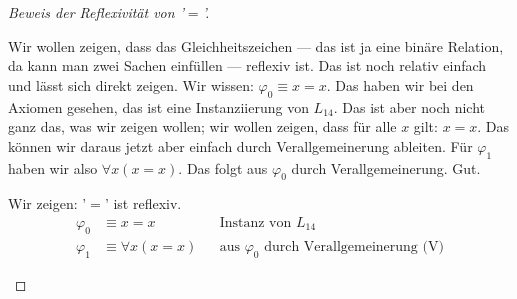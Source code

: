 \begin{proof}[Beweis der Reflexivität von '$=$']
\begin{spoken-clean}[00:54:25 - 00:55:30]
Wir wollen zeigen, dass das Gleichheitszeichen --- das ist ja eine binäre Relation, da kann man zwei Sachen einfüllen --- reflexiv ist. Das ist noch relativ einfach und lässt sich direkt zeigen. Wir wissen: $\varphi_0 \equiv x=x$. Das haben wir bei den Axiomen gesehen, das ist eine Instanziierung von $L_{14}$. Das ist aber noch nicht ganz das, was wir zeigen wollen; wir wollen zeigen, dass für alle $x$ gilt: $x=x$. Das können wir daraus jetzt aber einfach durch Verallgemeinerung ableiten. Für $\varphi_1$ haben wir also $\forall x (x=x)$. Das folgt aus $\varphi_0$ durch Verallgemeinerung. Gut.
\end{spoken-clean}

\begin{math-stroke}
Wir zeigen: '$=$' ist reflexiv.
\begin{align*}
\varphi_0 &\equiv x = x && \text{Instanz von } L_{14} \\
\varphi_1 &\equiv \forall x (x = x) && \text{aus } \varphi_0 \text{ durch Verallgemeinerung (V)}
\end{align*}
\end{math-stroke}
\end{proof}

